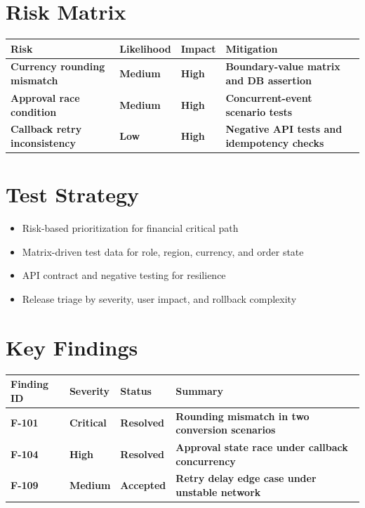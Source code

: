 \documentclass[11pt,a4paper]{article}
\begin{document}
\section*{Risk Matrix}
\begin{tabularx}{\textwidth}{>{\bfseries}p{}>{\bfseries}p{}>{\bfseries}p{}>{\bfseries}X}
\toprule
Risk & Likelihood & Impact & Mitigation \\
\midrule
Currency rounding mismatch & Medium & High & Boundary-value matrix and DB assertion \\
Approval race condition & Medium & High & Concurrent-event scenario tests \\
Callback retry inconsistency & Low & High & Negative API tests and idempotency checks \\
\bottomrule
\end{tabularx}

\section*{Test Strategy}
\begin{itemize}
  \item Risk-based prioritization for financial critical path
  \item Matrix-driven test data for role, region, currency, and order state
  \item API contract and negative testing for resilience
  \item Release triage by severity, user impact, and rollback complexity
\end{itemize}

\section*{Key Findings}
\begin{tabularx}{\textwidth}{>{\bfseries}p{}>{\bfseries}p{}>{\bfseries}p{}>{\bfseries}X}
\toprule
Finding ID & Severity & Status & Summary \\
\midrule
F-101 & Critical & Resolved & Rounding mismatch in two conversion scenarios \\
F-104 & High & Resolved & Approval state race under callback concurrency \\
F-109 & Medium & Accepted & Retry delay edge case under unstable network \\
\bottomrule
\end{tabularx}
\end{document}
